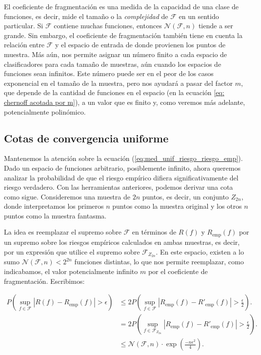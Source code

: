 \documentclass{article}
\begin{document}
El coeficiente de fragmentación es una medida de la capacidad de una clase de funciones, es decir, mide 
el tamaño o la \textit{complejidad} de \(\mathcal{F}\) en un sentido particular. Si \(\mathcal{F}\) contiene muchas funciones, entonces 
$\mathcal{N}(\mathcal{F}, n)$ tiende a ser grande. Sin embargo, el coeficiente de fragmentación también tiene en cuenta 
la relación entre \(\mathcal{F}\) y el espacio de entrada de donde provienen los puntos de muestra. Más aún, nos permite asignar un número
finito a cada espacio de clasificadores para cada tamaño de muestras, aún cuando los espacios de funciones sean infinitos. Este número puede
ser en el peor de los casos exponencial en el tamaño de la muestra, pero nos ayudará a pasar del factor $m$, que depende de la cantidad
de funciones en el espacio (en la ecuación \ref{eq: chernoff acotada por m}), a un valor que es finito y, como veremos más adelante,
potencialmente polinómico.\newline

\subsection{Cotas de convergencia uniforme}

Mantenemos la atención sobre la ecuación (\ref{eq:med_unif_riesgo_riesgo_emp}). Dado un espacio de funciones arbitrario, 
posiblemente infinito, ahora queremos analizar la probabilidad 
de que el riesgo empírico difiera significativamente del riesgo verdadero. Con las herramientas anteriores, 
podemos derivar una cota como sigue. Consideremos una muestra de \(2n\) puntos, es decir, un conjunto 
\(Z_{2n}\), donde interpretamos los primeros \(n\) puntos como la muestra original y los otros \(n\) 
puntos como la muestra fantasma.\newline

La idea es reemplazar el supremo sobre \(\mathcal{F}\) en términos de \(R(f)\) y 
\(R_{\text{emp}}(f)\) por un supremo sobre los riesgos empíricos calculados en ambas muestras, es decir, por un expresión
que utilice el supremo sobre \(\mathcal{F}_{Z_{2n}}\). En este espacio, existen a lo sumo $\mathcal{N}(\mathcal{F}, n)<2^{2n}$
funciones distintas, lo que nos permite reemplazar, como indicabamos, el valor potencialmente infinito $m$ por el coeficiente de 
fragmentación. Escribimos:\newline

\[
\begin{aligned}
P\left(\sup_{f \in \mathcal{F}} |R(f) - R_{\text{emp}}(f)| > \epsilon\right) &\leq 
2P\left(\sup_{f \in \mathcal{F}} |R_{\text{emp}}(f) - R'_{\text{emp}}(f)| > \frac{\epsilon}{2}\right).\\
& = 2P\left(\sup_{f \in \mathcal{F}_{Z_{2n}}} |R_{\text{emp}}(f) - R'_{\text{emp}}(f)| > \frac{\epsilon}{2}\right).\\
& \leq  \mathcal{N}(\mathcal{F}, n)\cdot \exp\left(\frac{-n\epsilon^2}{4}\right).
\end{aligned}
\]
\end{document}
